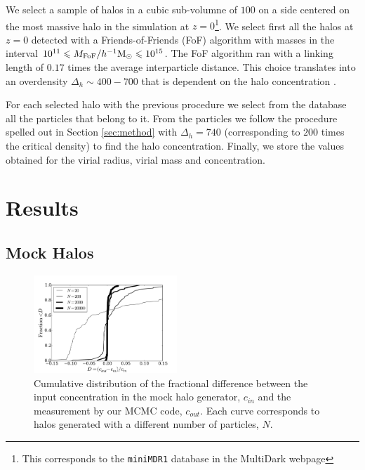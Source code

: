 \documentclass[useAMS,usenatbib]{mn2e}
\newcommand{\hMpc}{{\ifmmode{h^{-1}{\rm Mpc}}\else{$h^{-1}$Mpc }\fi}}
\newcommand{\hMsun}{{\ifmmode{h^{-1}{\rm
        {M_{\odot}}}}\else{$h^{-1}{\rm{M_{\odot}}}$~}\fi}}
\begin{document}
We select a sample of halos in a cubic sub-volumne of $100$ \hMpc on a
side centered on the most massive halo in the simulation at
$z=0$\footnote{This corresponds to the \texttt{miniMDR1} database in
  the MultiDark webpage}. We select first all the halos at $z=0$
detected with a Friends-of-Friends (FoF) algorithm with masses in the
interval $10^{11}\leq M_{\rm FoF}/\hMsun \leq 10^{15}$. The FoF
algorithm ran with a linking length of $0.17$ times the average
interparticle distance. This choice translates into an overdensity
$\Delta_h\sim 400-700$ that is dependent on the halo concentration
\citep{More2011}.

For each selected halo with the previous procedure we select from the database
all the particles that belong to it. From the particles we follow the
procedure spelled out in Section \ref{sec:method} with $\Delta_h=740$
(corresponding to $200$ times the critical density) to find the
halo concentration. Finally, we store the values obtained for the
virial radius, virial mass and concentration. 


\section{Results}
\label{sec:results}


\subsection{Mock Halos}
\label{sec:results_mocks}

\begin{figure}
\begin{center}
  \includegraphics[width=0.48\textwidth]{percentual_diff.pdf}
\end{center}
\caption{Cumulative distribution of the fractional difference between
  the input concentration in the mock halo generator, $c_{in}$ and the
  measurement by our MCMC code, $c_{out}$. Each curve corresponds to
  halos generated with a different number of particles, $N$.
    \label{fig:results_mocks}}
\end{figure}
\end{document}
